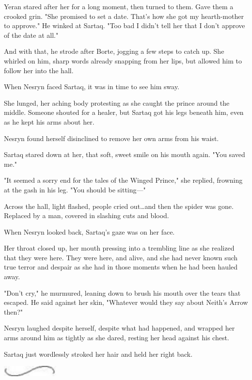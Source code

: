 Yeran stared after her for a long moment, then turned to them.
Gave them a crooked grin.
"She promised to set a date.
That's how she got my hearth-mother to approve."
He winked at Sartaq.
"Too bad I didn't tell her that I don't approve of the date at all."

And with that, he strode after Borte, jogging a few steps to catch up.
She whirled on him, sharp words already snapping from her lips, but allowed him to follow her into the hall.

When Nesryn faced Sartaq, it was in time to see him sway.

She lunged, her aching body protesting as she caught the prince around the middle.
Someone shouted for a healer, but Sartaq got his legs beneath him, even as he kept his arms about her.

Nesryn found herself disinclined to remove her own arms from his waist.

Sartaq stared down at her, that soft, sweet smile on his mouth again.
"You saved me."

"It seemed a sorry end for the tales of the Winged Prince," she replied, frowning at the gash in his leg.
"You should be sitting---"

Across the hall, light flashed, people cried out\ldots and then the spider was gone.
Replaced by a man, covered in slashing cuts and blood.

When Nesryn looked back, Sartaq's gaze was on her face.

Her throat closed up, her mouth pressing into a trembling line as she realized that they were here.
They were here, and alive, and she had never known such true terror and despair as she had in those moments when he had been hauled away.

"Don't cry," he murmured, leaning down to brush his mouth over the tears that escaped.
He said against her skin, "Whatever would they say about Neith's Arrow then?"

Nesryn laughed despite herself, despite what had happened, and wrapped her arms around him as tightly as she dared, resting her head against his chest.

Sartaq just wordlessly stroked her hair and held her right back.

\begin{center}
	\includegraphics[width=1.12in,height=0.24in]{images/seperator}
\end{center}

